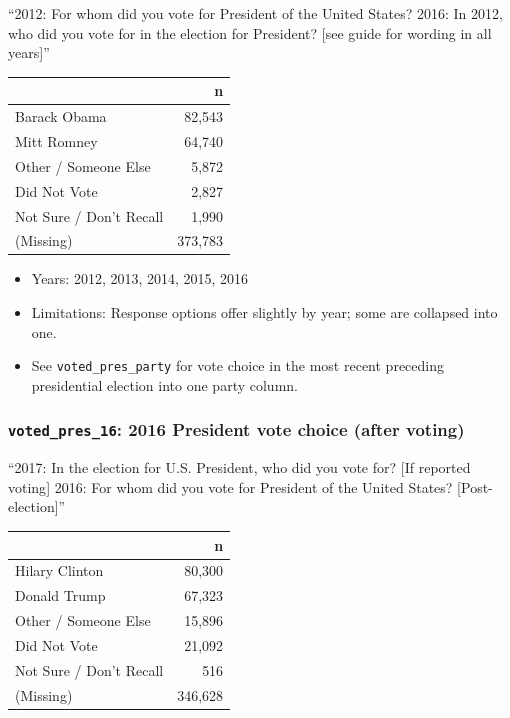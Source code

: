 \documentclass[10pt,article,oneside]{memoir}
\theoremstyle{definition}
\begin{document}
``2012: For whom did you vote for President of the United States? 2016:
In 2012, who did you vote for in the election for President? {[}see
guide for wording in all years{]}''

\begin{table}[H]
\centering
\begin{tabular}[t]{lr}
\toprule
 & n\\
\midrule
Barack Obama & 82,543\\
Mitt Romney & 64,740\\
Other / Someone Else & 5,872\\
Did Not Vote & 2,827\\
Not Sure / Don't Recall & 1,990\\
(Missing) & 373,783\\
\bottomrule
\end{tabular}
\end{table}

\begin{itemize}
\tightlist
\item
  Years: 2012, 2013, 2014, 2015, 2016
\item
  Limitations: Response options offer slightly by year; some are
  collapsed into one.
\item
  See \texttt{voted\_pres\_party} for vote choice in the most recent
  preceding presidential election into one party column.
\end{itemize}

\hypertarget{voted_pres_16-2016-president-vote-choice-after-voting}{%
\subsubsection{\texorpdfstring{\texttt{voted\_pres\_16}: 2016 President
vote choice (after
voting)}{voted\_pres\_16: 2016 President vote choice (after voting)}}\label{voted_pres_16-2016-president-vote-choice-after-voting}}

``2017: In the election for U.S. President, who did you vote for? {[}If
reported voting{]} 2016: For whom did you vote for President of the
United States? {[}Post-election{]}''

\begin{table}[H]
\centering
\begin{tabular}[t]{lr}
\toprule
 & n\\
\midrule
Hilary Clinton & 80,300\\
Donald Trump & 67,323\\
Other / Someone Else & 15,896\\
Did Not Vote & 21,092\\
Not Sure / Don't Recall & 516\\
(Missing) & 346,628\\
\bottomrule
\end{tabular}
\end{table}
\end{document}
